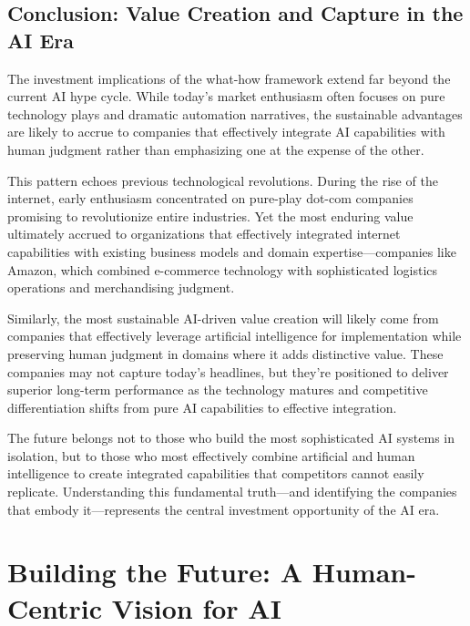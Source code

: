 \documentclass[
  Letterpaper,
]{scrbook}
\begin{document}
\section{Conclusion: Value Creation and Capture in the AI
Era}\label{conclusion-value-creation-and-capture-in-the-ai-era}

The investment implications of the what-how framework extend far beyond
the current AI hype cycle. While today's market enthusiasm often focuses
on pure technology plays and dramatic automation narratives, the
sustainable advantages are likely to accrue to companies that
effectively integrate AI capabilities with human judgment rather than
emphasizing one at the expense of the other.

This pattern echoes previous technological revolutions. During the rise
of the internet, early enthusiasm concentrated on pure-play dot-com
companies promising to revolutionize entire industries. Yet the most
enduring value ultimately accrued to organizations that effectively
integrated internet capabilities with existing business models and
domain expertise---companies like Amazon,
which combined e-commerce technology with sophisticated
logistics operations and merchandising judgment.

Similarly, the most sustainable AI-driven value creation will likely
come from companies that effectively leverage artificial intelligence
for implementation while preserving human judgment in domains where it
adds distinctive value. These companies may not capture today's
headlines, but they're positioned to deliver superior long-term
performance as the technology matures and competitive differentiation
shifts from pure AI capabilities to effective integration.

The future belongs not to those who build the most sophisticated AI
systems in isolation, but to those who most effectively combine
artificial and human intelligence to create integrated capabilities that
competitors cannot easily replicate. Understanding this fundamental
truth---and identifying the companies that embody it---represents the
central investment opportunity of the AI era.


\chapter{Building the Future: A Human-Centric Vision for
AI}\label{building-the-future-a-human-centric-vision-for-ai}
\end{document}

